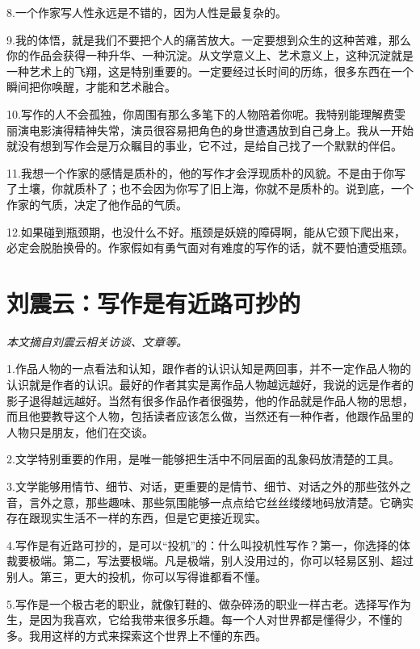 \documentclass[fontset=fandol,12pt,a5paper]{ctexbook}
\begin{document}
8.一个作家写人性永远是不错的，因为人性是最复杂的。

9.我的体悟，就是我们不要把个人的痛苦放大。一定要想到众生的这种苦难，那么你的作品会获得一种升华、一种沉淀。从文学意义上、艺术意义上，这种沉淀就是一种艺术上的飞翔，这是特别重要的。一定要经过长时间的历练，很多东西在一个瞬间把你唤醒，才能和艺术融合。

10.写作的人不会孤独，你周围有那么多笔下的人物陪着你呢。我特别能理解费雯丽演电影演得精神失常，演员很容易把角色的身世遭遇放到自己身上。我从一开始就没有想到写作会是万众瞩目的事业，它不过，是给自己找了一个默默的伴侣。

11.我想一个作家的感情是质朴的，他的写作才会浮现质朴的风貌。不是由于你写了土壤，你就质朴了；也不会因为你写了旧上海，你就不是质朴的。说到底，一个作家的气质，决定了他作品的气质。

12.如果碰到瓶颈期，也没什么不好。瓶颈是妖娆的障碍啊，能从它颈下爬出来，必定会脱胎换骨的。作家假如有勇气面对有难度的写作的话，就不要怕遭受瓶颈。

\newpage

\section{刘震云：写作是有近路可抄的}

\emph{本文摘自刘震云相关访谈、文章等。}
\vspace{2em}

1.作品人物的一点看法和认知，跟作者的认识认知是两回事，并不一定作品人物的认识就是作者的认识。最好的作者其实是离作品人物越远越好，我说的远是作者的影子退得越远越好。当然有很多作品作者很强势，他的作品就是作品人物的思想，而且他要教导这个人物，包括读者应该怎么做，当然还有一种作者，他跟作品里的人物只是朋友，他们在交谈。

2.文学特别重要的作用，是唯一能够把生活中不同层面的乱象码放清楚的工具。

3.文学能够用情节、细节、对话，更重要的是情节、细节、对话之外的那些弦外之音，言外之意，那些趣味、那些氛围能够一点点给它丝丝缕缕地码放清楚。它确实存在跟现实生活不一样的东西，但是它更接近现实。

4.写作是有近路可抄的，是可以“投机”的：什么叫投机性写作？第一，你选择的体裁要极端。第二，写法要极端。凡是极端，别人没用过的，你可以轻易区别、超过别人。第三，更大的投机，你可以写得谁都看不懂。

5.写作是一个极古老的职业，就像钉鞋的、做杂碎汤的职业一样古老。选择写作为生，是因为我喜欢，它给我带来很多乐趣。每一个人对世界都是懂得少，不懂的多。我用这样的方式来探索这个世界上不懂的东西。
\end{document}
